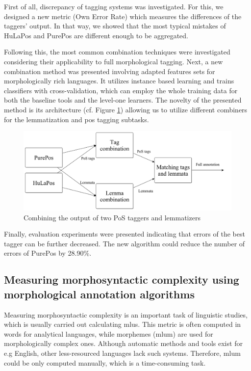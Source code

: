 First of all, discrepancy of tagging systems was investigated. 
For this, we designed a new metric (Own Error Rate) which measures the differences of the taggers' output.
In that way, we showed that the most typical mistakes of HuLaPos \cite{Laki2013} and PurePos are different enough to be aggregated.

Following this, the most common combination techniques were investigated considering their applicability to full morphological tagging.
Next, a new combination method was presented involving adapted features sets for morphologically rich languages.
It utilizes instance based learning \cite{Aha1991} and trains classifiers with cross-validation, which
can employ the whole training data for both the baseline tools and the level-one learners. %
The novelty of the presented method is its architecture (cf. Figure \ref{fig:comb3_en}) allowing us to utilize different combiners for the lemmatization and \acrshort{pos} tagging subtasks.

\begin{figure}[H]
  \centering
  \includegraphics[scale=0.15]{MorphTagging/comb3.png} 
  \caption{Combining the output of two PoS taggers and lemmatizers}
  \label{fig:comb3_en}
\end{figure}

Finally, evaluation experiments were presented indicating that errors of the best tagger can be further decreased.
The new algorithm could reduce the number of errors of PurePos by 28.90\%.

\subsection{Measuring morphosyntactic complexity using morphological annotation algorithms}
\label{thes:mlu}


Measuring morphosyntactic complexity is an important task of linguistic studies, which is usually carried out calculating \acrlong{mlu}s.
This metric is often computed in words for analytical languages, while morphemes (\acrshort{mlum}) are used for morphologically complex ones.
Although automatic methods and tools exist for e.g English, other less-resourced languages lack such systems.
Therefore, \acrshort{mlum} could be only computed manually, which is a time-consuming task.

